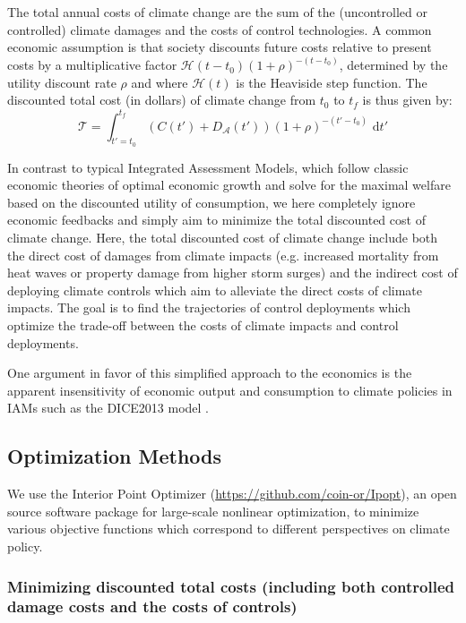 \documentclass{article}
\begin{document}
The total annual costs of climate change are the sum of the (uncontrolled or controlled) climate damages and the costs of control technologies. A common economic assumption is that society discounts future costs relative to present costs by a multiplicative factor $\mathcal{H}(t-t_{0})(1 + \rho)^{-(t-t_{0})}$, determined by the utility discount rate $\rho$ and where $\mathcal{H}(t)$ is the Heaviside step function. The discounted total cost (in dollars) of climate change from $t_{0}$ to $t_{f}$ is thus given by:
\begin{equation}
    \mathcal{T} =
    \int_{t'=t_{0}}^{t_{f}}
    (C(t') + D_{\mathcal{A}}(t')) (1 + \rho)^{-(t'-t_{0})} \text{ d}t'
\end{equation}

In contrast to typical Integrated Assessment Models, which follow classic economic theories of optimal economic growth and solve for the maximal welfare based on the discounted utility of consumption, we here completely ignore economic feedbacks and simply aim to minimize the total discounted cost of climate change. Here, the total discounted cost of climate change include both the direct cost of damages from climate impacts (e.g. increased mortality from heat waves or property damage from higher storm surges) and the indirect cost of deploying climate controls which aim to alleviate the direct costs of climate impacts. The goal is to find the trajectories of control deployments which optimize the trade-off between the costs of climate impacts and control deployments.

One argument in favor of this simplified approach to the economics is the apparent insensitivity of economic output and consumption to climate policies in IAMs such as the DICE2013 model \cite[][figures 2 and 3]{Nordhaus}.

\subsection{Optimization Methods}

We use the Interior Point Optimizer (\href{https://github.com/coin-or/Ipopt}{https://github.com/coin-or/Ipopt}), an open source software package for large-scale nonlinear optimization, to minimize various objective functions which correspond to different perspectives on climate policy.

\subsubsection{Minimizing discounted total costs (including both controlled damage costs and the costs of controls)}
\end{document}
